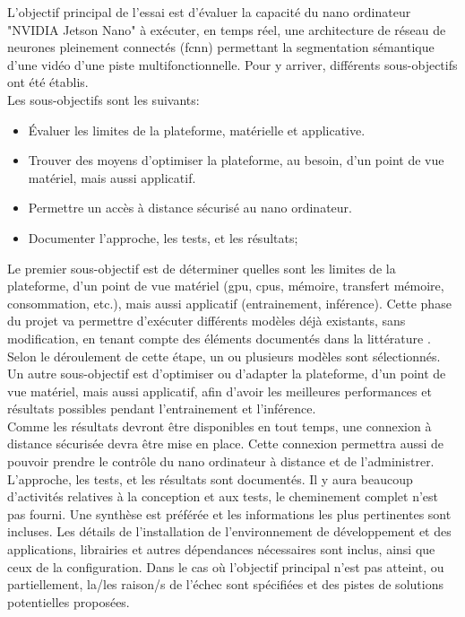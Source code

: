 ﻿\noindent L'objectif principal de l'essai est d'évaluer la capacité du nano ordinateur "NVIDIA Jetson Nano" à exécuter, en temps réel, une architecture de réseau de neurones pleinement connectés (\acrshort{fcnn}) permettant la segmentation sémantique d'une vidéo d'une piste multifonctionnelle. Pour y arriver, différents sous-objectifs ont été établis. 
\vspace{\baselineskip}
\\
\noindent Les sous-objectifs sont les suivants: 
\begin{itemize}
   \item Évaluer les limites de la plateforme, matérielle et applicative.
   \item Trouver des moyens d'optimiser la plateforme, au besoin, d'un point de vue matériel, mais aussi applicatif.
   \item Permettre un accès à distance sécurisé au nano ordinateur.
   \item Documenter l'approche, les tests, et les résultats;
\end{itemize}
\vspace{\baselineskip}
\noindent Le premier sous-objectif est de déterminer quelles sont les limites de la plateforme, d'un point de vue matériel (\acrshort{gpu}, \acrshort{cpu}s, mémoire, transfert mémoire, consommation, etc.), mais aussi applicatif (entrainement, inférence). Cette phase du projet va permettre d'exécuter différents modèles déjà existants, sans modification, en tenant compte des éléments documentés dans la littérature \parencite{nguyen_mavnet_2019, zheng_real-time_2020, nvidia_jetson_2019-1}. Selon le déroulement de cette étape, un ou plusieurs modèles sont sélectionnés. 
\vspace{\baselineskip}
\\
\noindent Un autre sous-objectif est d'optimiser ou d'adapter la plateforme, d'un point de vue matériel, mais aussi applicatif, afin d'avoir les meilleures performances et résultats possibles pendant l'entrainement et l'inférence.
\vspace{\baselineskip}
\\
\noindent Comme les résultats devront être disponibles en tout temps, une connexion à distance sécurisée devra être mise en place. Cette connexion permettra aussi de pouvoir prendre le contrôle du nano ordinateur à distance et de l'administrer.
\vspace{\baselineskip}
\\
\noindent L'approche, les tests, et les résultats sont documentés. Il y aura beaucoup d'activités relatives à la conception et aux tests, le cheminement complet n'est pas fourni. Une synthèse est préférée et les informations les plus pertinentes sont incluses. Les détails de l'installation de l'environnement de développement et des applications, librairies et autres dépendances nécessaires sont inclus, ainsi que ceux de la configuration. Dans le cas où l'objectif principal n'est pas atteint, ou partiellement, la/les raison/s de l'échec sont spécifiées et des pistes de solutions potentielles proposées.
